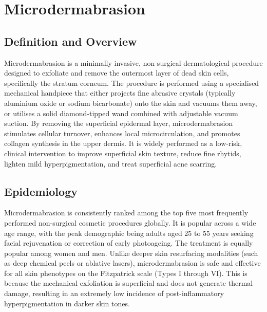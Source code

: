 \chapter{Microdermabrasion}

\section*{Definition and Overview}
Microdermabrasion is a minimally invasive, non-surgical dermatological procedure designed to exfoliate and remove the outermost layer of dead skin cells, specifically the stratum corneum. The procedure is performed using a specialised mechanical handpiece that either projects fine abrasive crystals (typically aluminium oxide or sodium bicarbonate) onto the skin and vacuums them away, or utilises a solid diamond-tipped wand combined with adjustable vacuum suction. By removing the superficial epidermal layer, microdermabrasion stimulates cellular turnover, enhances local microcirculation, and promotes collagen synthesis in the upper dermis. It is widely performed as a low-risk, clinical intervention to improve superficial skin texture, reduce fine rhytids, lighten mild hyperpigmentation, and treat superficial acne scarring.

\section*{Epidemiology}
Microdermabrasion is consistently ranked among the top five most frequently performed non-surgical cosmetic procedures globally. It is popular across a wide age range, with the peak demographic being adults aged 25 to 55 years seeking facial rejuvenation or correction of early photoageing. The treatment is equally popular among women and men. Unlike deeper skin resurfacing modalities (such as deep chemical peels or ablative lasers), microdermabrasion is safe and effective for all skin phenotypes on the Fitzpatrick scale (Types I through VI). This is because the mechanical exfoliation is superficial and does not generate thermal damage, resulting in an extremely low incidence of post-inflammatory hyperpigmentation in darker skin tones.

